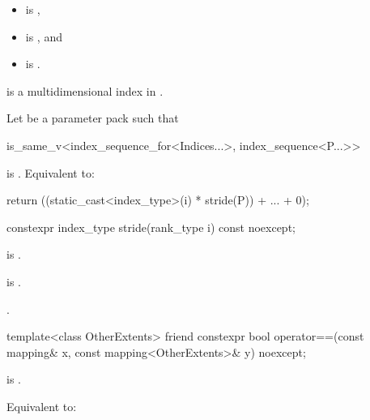 \begin{itemdescr}
\pnum
\constraints
\begin{itemize}
\item
{} is ,
\item
{} is , and
\item
{} is
.
\end{itemize}

\pnum
\expects
{} is
a multidimensional index in .

\pnum
\effects
Let  be a parameter pack such that
\begin{codeblock}
is_same_v<index_sequence_for<Indices...>, index_sequence<P...>>
\end{codeblock}
is . Equivalent to:
\begin{codeblock}
return ((static_cast<index_type>(i) * stride(P)) + ... + 0);
\end{codeblock}
\end{itemdescr}

%
\begin{itemdecl}
constexpr index_type stride(rank_type i) const noexcept;
\end{itemdecl}

\begin{itemdescr}
\pnum
\constraints
{} is .

\pnum
\expects
{} is .

\pnum
\returns
{}.
\end{itemdescr}

%
\begin{itemdecl}
template<class OtherExtents>
  friend constexpr bool operator==(const mapping& x, const mapping<OtherExtents>& y) noexcept;
\end{itemdecl}

\begin{itemdescr}
\pnum
\constraints
{} is .

\pnum
\effects
Equivalent to: 
\end{itemdescr}

